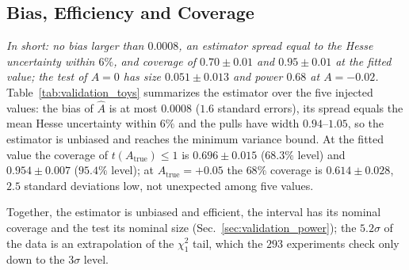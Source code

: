 \subsection{Bias, Efficiency and Coverage}
\label{sec:validation_estimator}
\emph{In short: no bias larger than $0.0008$, an estimator spread equal to the Hesse uncertainty within $6\%$, and coverage of $0.70\pm0.01$ and $0.95\pm0.01$ at the fitted value; the test of $A=0$ has size $0.051\pm0.013$ and power $0.68$ at $A=-0.02$.}
Table~\ref{tab:validation_toys} summarizes the estimator over the five injected values: the bias of $\hat A$ is at most $0.0008$ ($1.6$ standard errors), its spread equals the mean Hesse uncertainty within $6\%$ and the pulls have width $0.94$--$1.05$, so the estimator is unbiased and reaches the minimum variance bound. At the fitted value the coverage of $t(A_{\mathrm{true}})\leq1$ is $0.696\pm0.015$ ($68.3\%$ level) and $0.954\pm0.007$ ($95.4\%$ level); at $A_{\mathrm{true}}=+0.05$ the $68\%$ coverage is $0.614\pm0.028$, $2.5$ standard deviations low, not unexpected among five values.

\begin{table}[h]
\centering
{}
\caption{Toy-MC experiments at five injected values of the asymmetry: number of valid fits, bias of $\hat A$ with its standard error, spread of the estimates relative to the mean Hesse uncertainty ($0.0085$), and coverage of the intervals $t(A_{\mathrm{true}})\leq1$ and $\leq3.84$.}
\label{tab:validation_toys}
\end{table}

Together, the estimator is unbiased and efficient, the interval has its nominal coverage and the test its nominal size (Sec.~\ref{sec:validation_power}); the $5.2\sigma$ of the data is an extrapolation of the $\chi^2_1$ tail, which the $293$ experiments check only down to the $3\sigma$ level.
